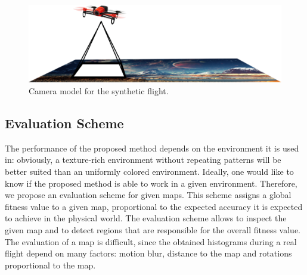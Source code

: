 \documentclass{report}
\begin{document}
\begin{figure}[h!]
\begin{center}
\includegraphics[width=0.672\columnwidth]{camera_model}
\caption{{Camera model for the synthetic flight.%
}}
\end{center}
\end{figure}

\subsection{Evaluation Scheme}
\label{sec:evaluationscheme}

The performance of the proposed method depends on the environment it
is used in: obviously, a texture-rich environment without repeating
patterns will be better suited than an uniformly colored
environment. Ideally, one would like to know if the proposed method is
able to work in a given environment. Therefore, we propose an
evaluation scheme for given maps. This scheme assigns a global fitness
value to a given map, proportional to the expected accuracy it is
expected to achieve in the physical world. The evaluation scheme
allows to inspect the given map and to detect regions that are
responsible for the overall fitness value. The evaluation of a map is
difficult, since the obtained histograms during a real flight depend
on many factors: motion blur, distance to the map and rotations
proportional to the map.
\end{document}
